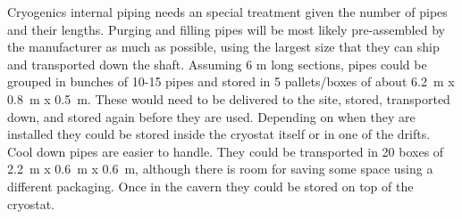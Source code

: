 Cryogenics internal piping needs an special treatment given the number of pipes and their lengths.
Purging and filling pipes will be most likely pre-assembled by the manufacturer as much as possible, using the largest  
size that they can ship and transported down the shaft. Assuming 6 m long sections,
pipes could be grouped in bunches of 10-15 pipes and stored in 5 pallets/boxes of about \SI{6.2}{m} x \SI{0.8}{m} x \SI{0.5}{m}. 
These would need to be delivered to the site, stored, transported down, and stored again before they are used.
Depending on when they are installed they could be stored inside the cryostat itself or in one of the drifts. 
Cool down pipes are easier to handle. They could be transported in 20 boxes of \SI{2.2}{m} x \SI{0.6}{m} x \SI{0.6}{m}, although
there is room for saving some space using a different packaging. 
Once in the cavern they could be stored on top of the cryostat.












